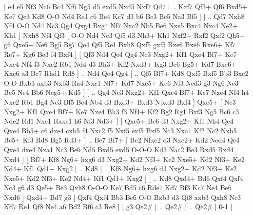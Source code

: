 \makegametitle 
|   e4   e5    Nf3   Nc6    Bc4   Nf6    Ng5   d5    exd5   Nxd5    Nxf7   Qd7 [ .. Kxf7  Qf3+ Qf6  Bxd5+ Ke7  Qc3 Kd8  O-O Nd4  Re1 c6  Be4 Kc7  d3 b6  Be3 Bc5  Na3 Bf5   ]  [ .. Qd7  Nxh8 Nf4  O-O Nd4  Nc3 Qg4  Qxg4 Bxg4  Nf7 Nxc2  Nb5 Be6  Nxe5 Bxc4  Nxc4 Ne2+  Kh1   ]  Nxh8   Nf4    Qf3 [  O-O Nd4  Nc3 Qf5  d3 Nh3+  Kh1 Nxf2+  Rxf2 Qxf2  Qh5+ g6  Qxe5+ Ne6  Bg5 Bg7  Qe4 Qf5  Re1 Bxh8  Qxf5 gxf5  Bxe6 Bxe6  Rxe6+ Kf7  Re7+ Kg6  Be3 f4  Bxf4   ]  [  Qf3 Nd4  Qe4 Qg4  Nc3 Nxg2+  Kf1 Qxe4  Bf7+ Ke7  Nxe4 Nf4  f3 Nxc2  Rb1 Nd4  d3 Bh3+  Kf2 Nxd3+  Kg3 Be6  Bg5+ Kd7  Bxe6+ Kxe6  a3 Be7  Rhd1 Rd8   ] .. Nd4    Qe4   Qg4 [ .. Qf5  Bf7+ Kd8  Qxf5 Bxf5  Bb3 Bxc2  O-O Bxb3  axb3 Nxb3  Ra4 Nxc1  Nf7+ Kd7  Nxe5+ Ke6  Nf3 Ncd3  g3 Ng6  Nc3 Bc5  Ne4 Bb6  Neg5+ Kd5   ]  [ .. Qg4  Nc3 Nxg2+  Kf1 Qxe4  Bf7+ Ke7  Nxe4 Nf4  h4 Nxc2  Rb1 Bg4  Nc3 Bf5  Bc4 Nb4  d3 Bxd3+  Bxd3 Nbxd3  Bxf4   ]  Qxe5+ [  Nc3 Nxg2+  Kf1 Qxe4  Bf7+ Ke7  Nxe4 Bh3  f3 Nf4+  Kf2 Bg2  Rg1 Bxf3  Ng5 Bc6  c3 Nde2  Rd1 Nxc1  Raxc1 h6  Nf3 Nd3+   ]  [  Qxe5+ Be6  d3 Nxg2+  Kf1 Nh4  Qe4 Qxe4  Bb5+ c6  dxe4 cxb5  f4 Nxc2  f5 Nxf5  exf5 Bxf5  Nc3 Nxa1  Kf2 Nc2  Nxb5 Bc5+  Kf3 Rd8  Bg5 Rd3+   ] .. Be7    Bf7+ [  Be2 Nfxe2  d3 Nxc2+  Kd2 Ned4  Qe4 Qxe4  dxe4 Nxa1  Nc3 Be6  Nd5 Bxd5  exd5 O-O-O  Kd3 Nac2  Be3 Rxd5  Bxd4 Nxd4   ]  [  Bf7+ Kf8  Ng6+ hxg6  d3 Nxg2+  Kd2 Nf3+  Ke2 Nxe5+  Kd2 Nf3+  Ke2 Nd4+  Kf1 Qd1+  Kxg2   ] .. Kd8 [ .. Kf8  Ng6+ hxg6  d3 Nxg2+  Kd2 Nf3+  Ke2 Nxe5+  Kd2 Nf3+  Ke2 Nd4+  Kf1 Qd1+  Kxg2   ]  [ .. Kd8  Qxd4+ Bd6  Qxf4 Qxf4  Nc3 g6  d3 Qe5+  Be3 Qxh8  O-O-O Ke7  Bd5 c6  Rde1 Kd7  Bf3 Kc7  Ne4 Be6  Nxd6   ]  Qxd4+   Bd7    g3 [  Qxf4 Qxf4  Bb3 Be6  O-O Bxb3  d3 Qf8  axb3 Qxh8  Nc3 Kd7  Re1 Qf8  Ne4 a6  Bd2 Bf6  c3 Re8   ]  [  g3 Qe2#   ] .. Qe2#    [ .. Qe2#   ] 0-1  |
